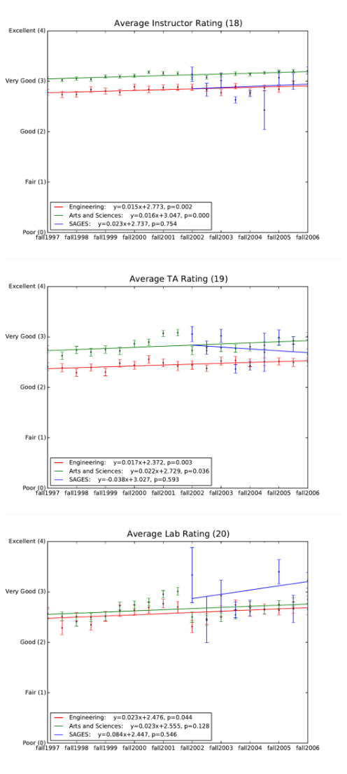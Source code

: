\documentclass[12pt]{article}
\begin{document}
\begin{center}
    \includegraphics[width=5in]{figures/18_instructor_over_time.pdf} \\
    \includegraphics[width=5in]{figures/19_ta_over_time.pdf} \\
    \includegraphics[width=5in]{figures/20_lab_over_time.pdf}
\end{center}
\end{document}
